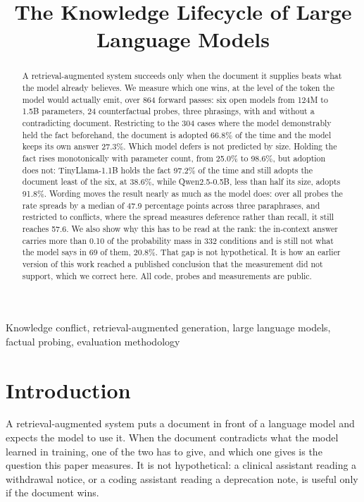 \documentclass[10pt,conference]{IEEEtran}
\title{The Knowledge Lifecycle of Large Language Models}
\author{\IEEEauthorblockN{Anonymous Submission}}
\author{
  \IEEEauthorblockN{Amey Thakur\orcidlink{0000-0001-5644-1575}}
  \IEEEauthorblockA{Independent Researcher\\
  Toronto, Canada\\
  \href{https://orcid.org/0000-0001-5644-1575}{ORCID: 0000-0001-5644-1575}\\
  \href{mailto:ameythakur20@gmail.com}{ameythakur20@gmail.com}}
  \and
  \IEEEauthorblockN{Sarvesh Talele\orcidlink{0009-0002-0818-461X}}
  \IEEEauthorblockA{Independent Researcher\\
  Mumbai, India\\
  \href{https://orcid.org/0009-0002-0818-461X}{ORCID: 0009-0002-0818-461X}\\
  \href{mailto:talelesarvesh@gmail.com}{talelesarvesh@gmail.com}}
  }
\begin{document}
\maketitle
\begin{abstract}
A retrieval-augmented system succeeds only when the document it supplies beats what the model already believes. We measure which one wins, at the level of the token the model would actually emit, over 864 forward passes: six open models from 124M to 1.5B parameters, 24 counterfactual probes, three phrasings, with and without a contradicting document. Restricting to the 304 cases where the model demonstrably held the fact beforehand, the document is adopted 66.8\% of the time and the model keeps its own answer 27.3\%. Which model defers is not predicted by size. Holding the fact rises monotonically with parameter count, from 25.0\% to 98.6\%, but adoption does not: TinyLlama-1.1B holds the fact 97.2\% of the time and still adopts the document least of the six, at 38.6\%, while Qwen2.5-0.5B, less than half its size, adopts 91.8\%. Wording moves the result nearly as much as the model does: over all probes the rate spreads by a median of 47.9 percentage points across three paraphrases, and restricted to conflicts, where the spread measures deference rather than recall, it still reaches 57.6. We also show why this has to be read at the rank: the in-context answer carries more than 0.10 of the probability mass in 332 conditions and is still not what the model says in 69 of them, 20.8\%. That gap is not hypothetical. It is how an earlier version of this work reached a published conclusion that the measurement did not support, which we correct here. All code, probes and measurements are public.
\end{abstract}
\begin{IEEEkeywords}
Knowledge conflict, retrieval-augmented generation, large language models, factual probing, evaluation methodology
\end{IEEEkeywords}
\section{Introduction}
A retrieval-augmented system puts a document in front of a language model and expects the model to use it. When the document contradicts what the model learned in training, one of the two has to give, and which one gives is the question this paper measures. It is not hypothetical: a clinical assistant reading a withdrawal notice, or a coding assistant reading a deprecation note, is useful only if the document wins.
\end{document}
